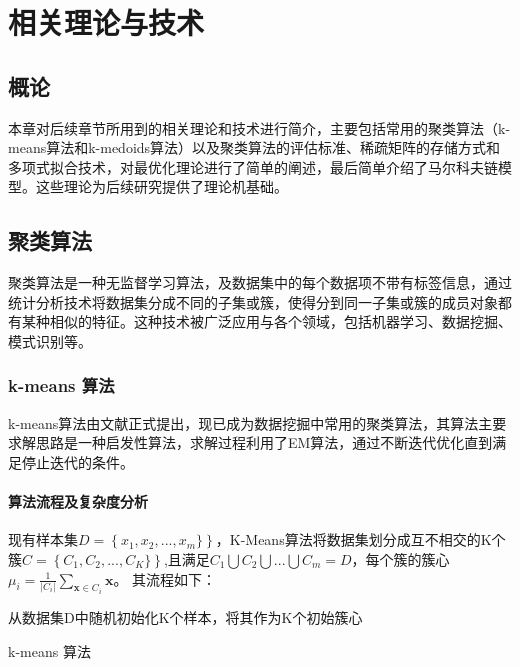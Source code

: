 \chapter{相关理论与技术}

\section{概论}

本章对后续章节所用到的相关理论和技术进行简介，主要包括常用的聚类算法（k-means算法和k-medoids算法）以及聚类算法的评估标准、稀疏矩阵的存储方式和多项式拟合技术，对最优化理论进行了简单的阐述，最后简单介绍了马尔科夫链模型。这些理论为后续研究提供了理论机基础。

\section{聚类算法}
聚类算法是一种无监督学习算法，及数据集中的每个数据项不带有标签信息，通过统计分析技术将数据集分成不同的子集或簇，使得分到同一子集或簇的成员对象都有某种相似的特征。这种技术被广泛应用与各个领域，包括机器学习、数据挖掘、模式识别等。

\subsection{k-means 算法}

k-means算法由文献\cite{hartigan1979algorithm}正式提出，现已成为数据挖掘中常用的聚类算法，其算法主要求解思路是一种启发性算法，求解过程利用了EM算法，通过不断迭代优化直到满足停止迭代的条件。

\subsubsection{算法流程及复杂度分析}

现有样本集$D=\left\{x_1,x_2,...,x_m\}\right\}$，K-Means算法将数据集划分成互不相交的K个簇$C=\left\{C_1,C_2,...,C_K\}\right\}$,且满足$C_1\bigcup{C_2\bigcup{...\bigcup{C_m=D}}}$，每个簇的簇心$\mu _i=\frac{1}{|C_i|}\sum_{\mathbf{x}\in C_i}{\mathbf{x}}$。
其流程如下：\\
\begin{algorithm}[H]
	\label{kmeans}
	 从数据集D中随机初始化K个样本，将其作为K个初始簇心\;
	 \caption{k-means 算法}
\end{algorithm}

